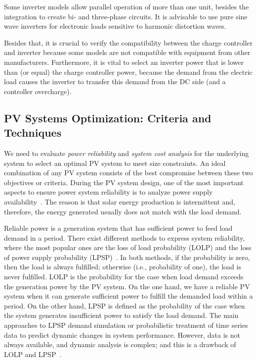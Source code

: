 \documentclass[journal]{IEEEtran}
\begin{document}
Some inverter models allow parallel operation of more than one unit, besides the integration to create bi- and three-phase circuits. It is advisable to use pure sine wave inverters for electronic loads sensitive to harmonic distortion waves.

Besides that, it is crucial to verify the compatibility between the charge controller and inverter because some models are not compatible with equipment from other manufacturers. Furthermore, it is vital to select an inverter power that is lower than (or equal) the charge controller power, because the demand from the electric load causes the inverter to transfer this demand from the DC side (and a controller overcharge).


\subsection{PV Systems Optimization: Criteria and Techniques}

We need to evaluate \textit{power reliability} and \textit{system cost analysis} for the underlying system to select an optimal PV system to meet size constraints. An ideal combination of any PV system consists of the best compromise between these two objectives or criteria. During the PV system design, one of the most important aspects to ensure power system reliability is to analyze power supply availability~\cite{Alsadi2018}. The reason is that solar energy production is intermittent and, therefore, the energy generated usually does not match with the load demand. 

Reliable power is a generation system that has sufficient power to feed load demand in a period. There exist different methods to express system reliability, where the most popular ones are the loss of load probability (LOLP) and the loss of power supply probability (LPSP)~\cite{Alsadi2018}. In both methods, if the probability is zero, then the load is always fulfilled; otherwise (i.e., probability of one), the load is never fulfilled. LOLP is the probability for the case when load demand exceeds the generation power by the PV system.
On the one hand, we have a reliable PV system when it can generate sufficient power to fulfill the demanded load within a period. On the other hand, LPSP is defined as the probability of the case when the system generates insufficient power to satisfy the load demand. The main approaches to LPSP demand simulation or probabilistic treatment of time series data to predict dynamic changes in system performance. However, data is not always available, and dynamic analysis is complex; and this is a drawback of LOLP and LPSP~\cite{Alsadi2018}.
\end{document}
